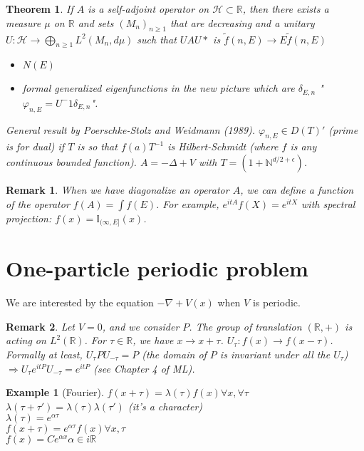 \documentclass{article}
\newtheorem*{theorem}{Theorem}
\newtheorem*{example}{Example}
\newtheorem*{remark}{Remark}
\newcommand{\RR}{\mathbb{R}}
\newcommand{\II}{\mathbb{I}}
\newcommand{\NN}{\mathbb{N}}
\newcommand{\cH}{\mathcal{H}}
\newcommand{\eps}{\epsilon}
\newcommand{\la}{\lambda}
\begin{document}
\begin{theorem}
  If $A$ is a self-adjoint operator on $\cH \subset \RR$, 
  then there exists a measure $\mu$ on $\RR$ and sets $(M_n)_{n \ge 1}$ that are decreasing and a unitary 
  $U \colon \cH \to \bigoplus_{n \ge 1} L^2(M_n,d\mu)$
  such that $U A U*$ is $\tilde{f}(n,E) \to E \tilde{f}(n,E)$
  \begin{itemize}
    \item $N(E)$
    \item formal generalized eigenfunctions in the new picture which are $\delta_{E,n}$ "$\varphi_{n,E} = U^-1 \delta_{E,n}$". 
  \end{itemize}
  General result by Poerschke-Stolz and Weidmann (1989).
  $\varphi_{n,E} \in D(T)'$ (prime is for dual) if $T$ is so that $f(a) T^{-1}$ is Hilbert-Schmidt (where $f$ is any continuous bounded function).
  $A = -\Delta + V$ with $T = (1+\NN^{d/2+\eps})$.
\end{theorem}

\begin{remark}
  When we have diagonalize an operator $A$, we can define a function of the operator $f(A) = \int f(E)$. 
  For example, $e^{itA} f(X) = e^{itX}$ with spectral projection: $f(x) = \II_{(\infty,E]} (x)$.
\end{remark}

\section{One-particle periodic problem}

We are interested by the equation $-\nabla + V(x)$ when $V$ is periodic.
\\

\begin{remark} 
  Let $V = 0$, and we consider $P$. 
  The group of translation $(\RR,+)$ is acting on $L^2(\RR)$.
  For $\tau \in \RR$, we have $x \to x + \tau$. $U_\tau \colon f(x) \to f(x-\tau)$.
  Formally at least, $U_\tau P U_{-\tau} = P$ (the domain of $P$ is invariant under all the $U_\tau$)
  $ \Rightarrow U_{\tau} e^{itP} U_{-\tau} = e^{itP}$ (see Chapter 4 of ML).
\end{remark} 

\begin{example}[Fourier]
    $f(x+\tau) = \la(\tau)f(x) \forall x, \forall \tau$\\
    $\la(\tau+\tau') = \la(\tau)\la(\tau')$ (it's a character)\\
    $\la(\tau) = e^{\alpha \tau}$\\
    $f(x+\tau) = e^{\alpha\tau} f(x) \forall x,\tau$\\
    $f(x) = C e^{\alpha x} \alpha \in i\RR$\\
\end{example}
\end{document}
